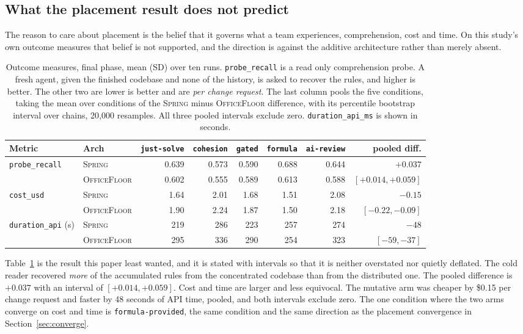 \documentclass[11pt,a4paper]{article}
\newcommand{\sprg}{\textsc{Spring}}
\newcommand{\offl}{\textsc{OfficeFloor}}
\begin{document}
\subsection{What the placement result does not predict}
\label{sec:nopredict}

The reason to care about placement is the belief that it governs what a team
experiences, comprehension, cost and time. On this study's own outcome measures that
belief is not supported, and the direction is against the additive architecture
rather than merely absent.

\begin{table}[t]
\centering
\caption{Outcome measures, final phase, mean (SD) over ten runs.
\texttt{probe\_recall} is a read only comprehension probe. A fresh agent, given
the finished codebase and none of the history, is asked to recover the rules, and
higher is better. The other two are lower is better and are \emph{per change
request}. The last column pools the five conditions, taking the mean over conditions of
the \sprg{} minus \offl{} difference, with its percentile bootstrap interval over
chains, 20{,}000 resamples. All three pooled intervals exclude zero.
\texttt{duration\_api\_ms} is shown in seconds.}
\label{tab:outcome}
\scriptsize
\setlength{\tabcolsep}{3pt}
\begin{tabular}{llrrrrrr}
\toprule
Metric & Arch & \texttt{just-solve} & \texttt{cohesion} & \texttt{gated} & \texttt{formula} & \texttt{ai-review} & pooled diff. \\
\midrule
\texttt{probe\_recall} & \sprg{} & 0.639 & 0.573 & 0.590 & 0.688 & 0.644 & $+0.037$ \\
                       & \offl{} & 0.602 & 0.555 & 0.589 & 0.613 & 0.588 & $[+0.014, +0.059]$ \\
\addlinespace
\texttt{cost\_usd} & \sprg{} & 1.64 & 2.01 & 1.68 & 1.51 & 2.08 & $-0.15$ \\
                   & \offl{} & 1.90 & 2.24 & 1.87 & 1.50 & 2.18 & $[-0.22, -0.09]$ \\
\addlinespace
\texttt{duration\_api} (s) & \sprg{} & 219 & 286 & 223 & 257 & 274 & $-48$ \\
                           & \offl{} & 295 & 336 & 290 & 254 & 323 & $[-59, -37]$ \\
\bottomrule
\end{tabular}
\end{table}

Table~\ref{tab:outcome} is the result this paper least wanted, and it is stated
with intervals so that it is neither overstated nor quietly deflated. The cold
reader recovered \emph{more} of the accumulated rules from the concentrated
codebase than from the distributed one. The pooled difference is $+0.037$ with an
interval of $[+0.014, +0.059]$. Cost and time are larger and less equivocal. The
mutative arm was cheaper by \$0.15 per change request and faster by 48 seconds of
API time, pooled, and both intervals exclude zero. The one condition where the two
arms converge on cost and time is \texttt{formula-provided}, the same condition
and the same direction as the placement convergence in Section~\ref{sec:converge}.
\end{document}
